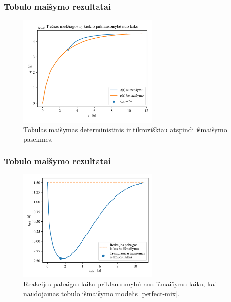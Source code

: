 \documentclass{beamer}
\begin{document}
\begin{frame}
\frametitle{Tobulo maišymo rezultatai}
\begin{figure}
\centering
\includegraphics[width=7cm]{../paper/assets/optimal-mix-qnt-1.png}
\caption{Tobulas maišymas deterministinis ir tikroviškiau atspindi išmaišymo pasekmes.}
\end{figure}
\end{frame}

\begin{frame}
    \frametitle{Tobulo maišymo rezultatai}
    \begin{figure}
        \centering
        \includegraphics[width=7cm]{../paper/assets/mix-end-1.png}
        \caption{Reakcijos pabaigos laiko priklausomybė nuo išmaišymo laiko, kai naudojamas tobulo išmaišymo modelis \eqref{perfect-mix}.}
    \end{figure}
\end{frame}
\end{document}
